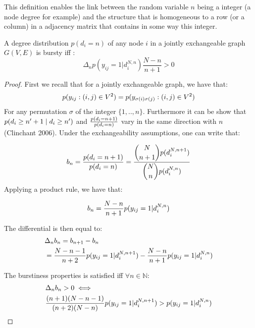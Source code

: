 This definition enables the link between the random variable $n$ being a integer (a node degree for example) and the structure that is homogeneous to a row (or a column) in a adjacency matrix that contains in some way this integer.

\begin{theorem} \label{th:burst_exch}
	 A degree distribution $p(d_i=n)$ of any node $i$ in a jointly exchangeable graph $G(V,E)$ is bursty iff :
	\begin{equation}
	 \Delta_n  p(y_{ij}=1 | d_i^{N,n}) \frac{N-n}{n+1} > 0
	\end{equation}

\end{theorem}

\begin{proof} 	\label{proof:glob}
	First we recall that for a jointly exchangeable graph, we have that:
	\begin{equation*}
	p(y_{ij}: (i,j) \in V^2) = p(y_{\sigma(i)\sigma(j)}: (i,j) \in V^2)
	\end{equation*}
	For any permutation $\sigma$ of the integer $\{1,..,n\}$. Furthermore it can be show that $ p(d_i \geq n'+1 \mid d_i \geq n')$ and $\frac{p(d_i=n+1)}{p(d_i=n)}$ vary in the same direction with $n$ (Clinchant 2006). Under the exchangeability assumptions, one can write that:
	
	\begin{align*}
	 b_n=\frac{p(d_i=n+1)}{p(d_i=n)} = \frac{\dbinom{N}{n+1} p(d_i^{N,n+1})}{\dbinom{N}{n} p(d_i^{N,n})}
	\end{align*}
 Applying a product rule, we have that:
	
	\begin{equation*}
	b_n = \frac{N-n}{n+1} p(y_{ij}=1 | d_i^{N,n})
	\end{equation*}
	
	The differential is then equal to:
	\begin{align*}
	&\Delta_n b_n= b_{n+1} - b_n  \\
	&= \frac{N-n-1}{n+2} p(y_{ij}=1 | d_i^{N,n+1}) - \frac{N-n}{n+1} p(y_{ij}=1 | d_i^{N,n})
	\end{align*}
	
	The burstiness properties is satisfied iff $\forall n \in \mathbb{N}$:
	\begin{align*}
	&\Delta_nb_n > 0 \iff \\
	& \frac{(n+1)(N-n-1)}{(n+2)(N-n)}p(y_{ij}=1 | d_i^{N,n+1})  > p(y_{ij}=1 | d_i^{N,n})
	\end{align*}
	

\end{proof}
